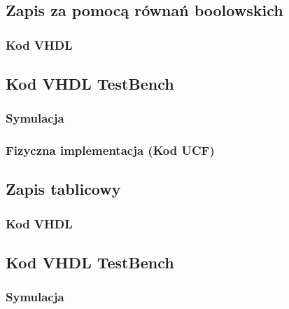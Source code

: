 \documentclass[a4paper,12pt]{extarticle}  %
\begin{document}
\subsection{Zapis za pomocą równań boolowskich}
\subsubsection{Kod VHDL}

\subsection{Kod VHDL TestBench}

\subsubsection{Symulacja}
\begin{figure}[H]
	\centering
\end{figure}
\subsubsection{Fizyczna implementacja (Kod UCF)}

\subsection{Zapis tablicowy}
\subsubsection{Kod VHDL}

\subsection{Kod VHDL TestBench}

\subsubsection{Symulacja}
\begin{figure}[H]
	\centering
\end{figure}
\end{document}
